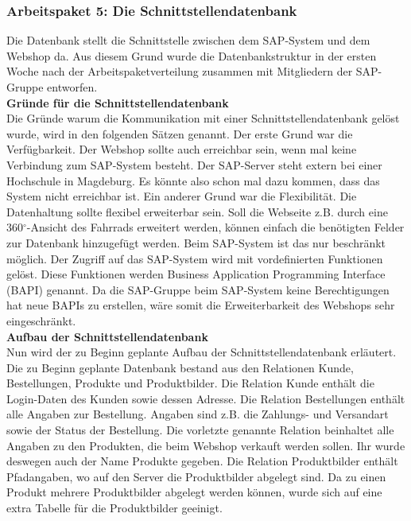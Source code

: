 \subsubsection{Arbeitspaket 5: Die Schnittstellendatenbank}
Die Datenbank stellt die Schnittstelle zwischen dem SAP-System und dem Webshop da. Aus diesem Grund wurde die Datenbankstruktur in der ersten Woche nach der Arbeitspaketverteilung zusammen mit Mitgliedern der SAP-Gruppe entworfen.\\

\textbf{Gründe für die Schnittstellendatenbank}\\
Die Gründe warum die Kommunikation mit einer Schnittstellendatenbank gelöst wurde, wird in den folgenden Sätzen genannt. Der erste Grund war die Verfügbarkeit. Der Webshop sollte auch erreichbar sein, wenn mal keine Verbindung zum SAP-System besteht. Der SAP-Server steht extern bei einer Hochschule in Magdeburg. Es könnte also schon mal dazu kommen, dass das System nicht erreichbar ist. Ein anderer Grund war die Flexibilität. Die Datenhaltung sollte flexibel erweiterbar sein. Soll die Webseite z.B. durch eine 360$^\circ$-Ansicht des Fahrrads erweitert werden, können einfach die benötigten Felder zur Datenbank hinzugefügt werden. Beim SAP-System ist das nur beschränkt möglich. Der Zugriff auf das SAP-System wird mit vordefinierten Funktionen gelöst. Diese Funktionen werden \glqq Business Application Programming Interface (BAPI)\grqq{} genannt. Da die SAP-Gruppe beim SAP-System keine Berechtigungen hat neue BAPIs zu erstellen, wäre somit die Erweiterbarkeit des Webshops sehr eingeschränkt.\\

\textbf{Aufbau der Schnittstellendatenbank}\\
Nun wird der zu Beginn geplante Aufbau der Schnittstellendatenbank erläutert. Die zu Beginn geplante Datenbank bestand aus den Relationen \glqq Kunde\grqq{}, \glqq Bestellungen\grqq{}, \glqq Produkte\grqq{} und \glqq Produktbilder\grqq{}. Die Relation \glqq Kunde\grqq{} enthält die Login-Daten des Kunden sowie dessen Adresse. Die Relation \glqq Bestellungen\grqq{} enthält alle Angaben zur Bestellung. Angaben sind z.B. die Zahlungs- und Versandart sowie der Status der Bestellung. Die vorletzte genannte Relation beinhaltet alle Angaben zu den Produkten, die beim Webshop verkauft werden sollen. Ihr wurde deswegen auch der Name \glqq Produkte\grqq{} gegeben. Die Relation \glqq Produktbilder\grqq{} enthält Pfadangaben, wo auf den Server die Produktbilder abgelegt sind. Da zu einen Produkt mehrere Produktbilder abgelegt werden können, wurde sich auf eine extra Tabelle für die Produktbilder geeinigt.

